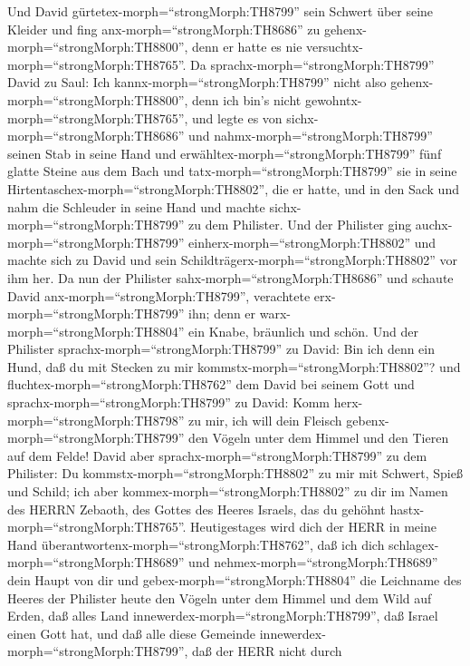 Und David gürtetex-morph=``strongMorph:TH8799'' sein Schwert über seine
Kleider und fing anx-morph=``strongMorph:TH8686'' zu
gehenx-morph=``strongMorph:TH8800'', denn er hatte es nie
versuchtx-morph=``strongMorph:TH8765''. Da
sprachx-morph=``strongMorph:TH8799'' David zu Saul: Ich
kannx-morph=``strongMorph:TH8799'' nicht also
gehenx-morph=``strongMorph:TH8800'', denn ich bin's nicht
gewohntx-morph=``strongMorph:TH8765'', und legte es von
sichx-morph=``strongMorph:TH8686''  und
nahmx-morph=``strongMorph:TH8799'' seinen Stab in seine Hand und
erwähltex-morph=``strongMorph:TH8799'' fünf glatte Steine aus dem Bach
und tatx-morph=``strongMorph:TH8799'' sie in seine
Hirtentaschex-morph=``strongMorph:TH8802'', die er hatte, und in den
Sack und nahm die Schleuder in seine Hand und machte
sichx-morph=``strongMorph:TH8799'' zu dem Philister.  Und
der Philister ging auchx-morph=``strongMorph:TH8799''
einherx-morph=``strongMorph:TH8802'' und machte sich zu David und sein
Schildträgerx-morph=``strongMorph:TH8802'' vor ihm her.  Da
nun der Philister sahx-morph=``strongMorph:TH8686'' und schaute David
anx-morph=``strongMorph:TH8799'', verachtete
erx-morph=``strongMorph:TH8799'' ihn; denn er
warx-morph=``strongMorph:TH8804'' ein Knabe, bräunlich und schön.
 Und der Philister sprachx-morph=``strongMorph:TH8799'' zu
David: Bin ich denn ein Hund, daß du mit Stecken zu mir
kommstx-morph=``strongMorph:TH8802''? und
fluchtex-morph=``strongMorph:TH8762'' dem David bei seinem Gott
 und sprachx-morph=``strongMorph:TH8799'' zu David: Komm
herx-morph=``strongMorph:TH8798'' zu mir, ich will dein Fleisch
gebenx-morph=``strongMorph:TH8799'' den Vögeln unter dem Himmel und den
Tieren auf dem Felde!  David aber
sprachx-morph=``strongMorph:TH8799'' zu dem Philister: Du
kommstx-morph=``strongMorph:TH8802'' zu mir mit Schwert, Spieß und
Schild; ich aber kommex-morph=``strongMorph:TH8802'' zu dir im Namen des
HERRN Zebaoth, des Gottes des Heeres Israels, das du gehöhnt
hastx-morph=``strongMorph:TH8765''.  Heutigestages wird
dich der HERR in meine Hand überantwortenx-morph=``strongMorph:TH8762'',
daß ich dich schlagex-morph=``strongMorph:TH8689'' und
nehmex-morph=``strongMorph:TH8689'' dein Haupt von dir und
gebex-morph=``strongMorph:TH8804'' die Leichname des Heeres der
Philister heute den Vögeln unter dem Himmel und dem Wild auf Erden, daß
alles Land innewerdex-morph=``strongMorph:TH8799'', daß Israel einen
Gott hat,  und daß alle diese Gemeinde
innewerdex-morph=``strongMorph:TH8799'', daß der HERR nicht durch
